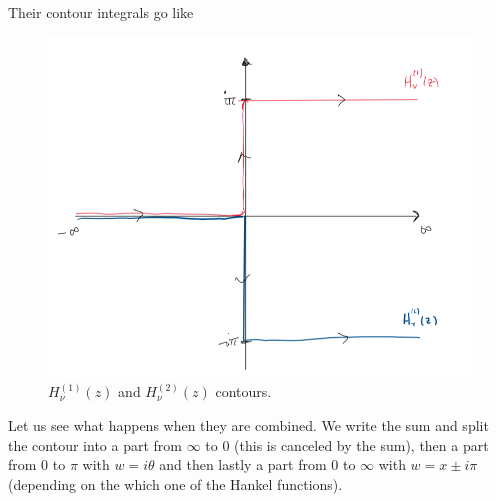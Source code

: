 \documentclass[a4paper,12pt]{article}
\begin{document}
Their contour integrals go like
\begin{figure}[H]
	\centering
	\includegraphics[width=0.55\linewidth]{25}
	\caption{$H_{\nu}^{(1)}(z)$ and $H_{\nu}^{(2)}(z)$ contours.}
	\label{fig:rectangle}
\end{figure}
Let us see what happens when they are combined. We write the sum and split the contour into a part from $\infty$ to 0 (this is canceled by the sum), then a part from $0$ to $\pi$ with $w=i\theta$ and then lastly a part from 0 to $\infty$ with $w=x\pm i\pi$ (depending on the which one of the Hankel functions).
\end{document}
